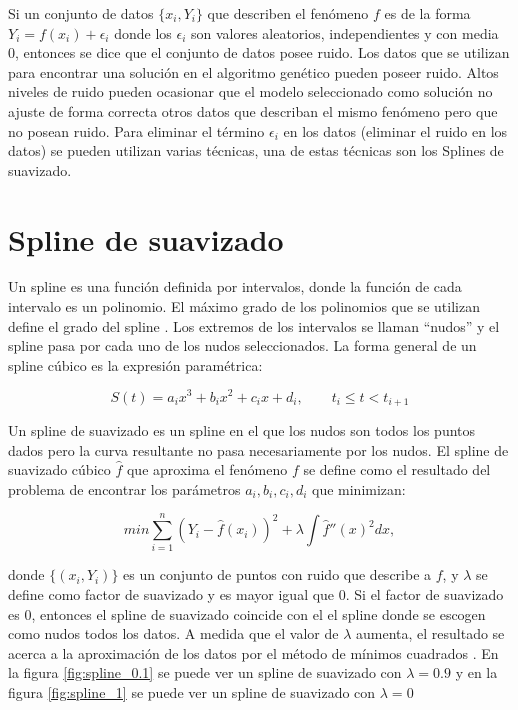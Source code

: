 Si un conjunto de datos $\{x_i, Y_i\}$ que describen el fenómeno $f$ es de la forma $Y_i = f(x_i) + \epsilon _i$ donde los $\epsilon _i$ son valores aleatorios, independientes y con media 0, entonces se dice que el conjunto de datos posee ruido. Los datos que se utilizan para encontrar una solución en el algoritmo genético pueden poseer ruido. Altos niveles de ruido pueden ocasionar que el modelo seleccionado como solución no ajuste de forma correcta otros datos que describan el mismo fenómeno pero que no posean ruido. Para eliminar el término $\epsilon _i$ en los datos (eliminar el ruido en los datos) se pueden utilizan varias técnicas, una de estas técnicas son los Splines de suavizado.

\section{Spline de suavizado}\label{section:smoothing_splines}

Un spline es una función definida por intervalos, donde la función de cada intervalo es un polinomio. El máximo grado de los polinomios que se utilizan define el grado del spline \cite{ahlberg1967theory}. Los extremos de los intervalos se llaman ``nudos'' y el spline pasa por cada uno de los nudos seleccionados. La forma general de un spline cúbico es la expresión paramétrica:

$$S(t) = a_ix^3 + b_ix^2 + c_ix + d_i, \qquad t_i \leq t < t_{i+1}$$

Un spline de suavizado es un spline en el que los nudos son todos los puntos dados pero la curva resultante no pasa necesariamente por los nudos. El spline de suavizado cúbico $\hat{f}$ que aproxima el fenómeno $f$ se define como el resultado del problema de encontrar los parámetros $a_i, b_i, c_i, d_i$ que minimizan:

$$min \sum_{i=1}^n (Y_i - \hat{f}(x_i))^2 + \lambda \int \hat{f}''(x)^2 dx,$$

donde $\{(x_i, Y_i)\}$ es un conjunto de puntos con ruido que describe a $f$, y $\lambda$ se define como factor de suavizado y es mayor igual que 0. Si el factor de suavizado es 0, entonces el spline de suavizado coincide con el el spline donde se escogen como nudos todos los datos. A medida que el valor de $\lambda$ aumenta, el resultado se acerca a la aproximación de los datos por el método de mínimos cuadrados \cite{green1993nonparametric}. En la figura \ref{fig:spline_0.1} se puede ver un spline de suavizado con $\lambda=0.9$ y en la figura \ref{fig:spline_1} se puede ver un spline de suavizado con $\lambda=0$

